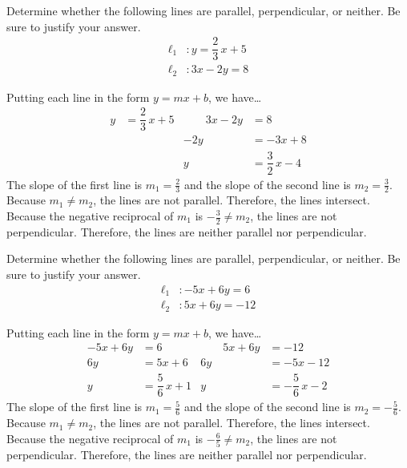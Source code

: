 \documentclass[11pt,letterpaper]{article}
\begin{document}

 Determine whether the following lines are parallel, perpendicular, or neither. Be sure to justify your answer. \pvspace{0.1cm}
	\[
	\begin{aligned}
	\ell_1 &\colon y= \dfrac{2}{3}\,x + 5 \\[0.3cm]
	\ell_2 &\colon 3x - 2y= 8
	\end{aligned}
	\] \pspace

\sol Putting each line in the form $y= mx + b$, we have\dots
	\[
	\begin{aligned}
	y&= \dfrac{2}{3}\,x + 5 &\qquad 3x - 2y&= 8 \\[0.3cm]
	& & -2y&= -3x + 8 \\[0.3cm]
	& & y&= \dfrac{3}{2}\,x - 4
	\end{aligned}
	\]
The slope of the first line is $m_1= \frac{2}{3}$ and the slope of the second line is $m_2= \frac{3}{2}$. Because $m_1 \neq m_2$, the lines are not parallel. Therefore, the lines intersect. Because the negative reciprocal of $m_1$ is $-\frac{3}{2} \neq m_2$, the lines are not perpendicular. Therefore, the lines are neither parallel nor perpendicular. 



\newpage



 Determine whether the following lines are parallel, perpendicular, or neither. Be sure to justify your answer. \pvspace{0.1cm}
	\[
	\begin{aligned}
	\ell_1 &\colon -5x + 6y= 6 \\[0.3cm]
	\ell_2 &\colon 5x + 6y= -12
	\end{aligned}
	\] \pspace

\sol Putting each line in the form $y= mx + b$, we have\dots
	\[
	\begin{aligned}
	-5x + 6y&= 6 &\qquad 5x + 6y&= -12 \\[0.3cm]
	6y&= 5x + 6 & 6y&= -5x - 12 \\[0.3cm]
	y&= \dfrac{5}{6}\,x + 1 & y&= -\dfrac{5}{6}\,x - 2
	\end{aligned}
	\]
The slope of the first line is $m_1= \frac{5}{6}$ and the slope of the second line is $m_2= -\frac{5}{6}$. Because $m_1 \neq m_2$, the lines are not parallel. Therefore, the lines intersect. Because the negative reciprocal of $m_1$ is $-\frac{6}{5} \neq m_2$, the lines are not perpendicular. Therefore, the lines are neither parallel nor perpendicular. 
\end{document}
